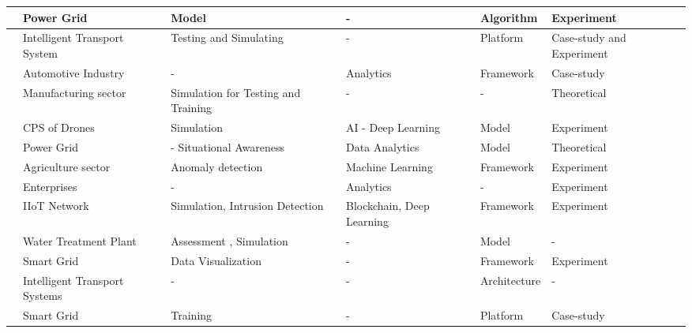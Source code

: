 \begin{table}[H]
\begin{NiceTabular}{p{0.5cm}|p{3cm}|p{2.5cm}|p{2cm}|p{3cm}|p{1.5cm}}
   \cite{hossenDigitalTwinSelfSecurity2021} & Power Grid & Model & - & Algorithm & Experiment \\
   \hline

   \cite{luongnguyenDigitalTwinIoT2022} & Intelligent Transport System & Testing and Simulating & - & Platform & Case-study and Experiment \\
    \hline

    \cite{almeaibedDigitalTwinAnalysis2021} & Automotive Industry & - & Analytics & Framework & Case-study \\
    \hline

    \cite{becueCyberFactorySecuringIndustry40with2018} & Manufacturing sector & Simulation for Testing and Training & - & - & Theoretical \\ 
    \hline

    \cite{wuDeepLearningDriven2022} & CPS of Drones & Simulation & AI - Deep Learning & Model & Experiment \\
    \hline

    \cite{salviCyberresilienceCriticalCyber2022} & Power Grid & - Situational Awareness & Data Analytics & Model & Theoretical \\
    \hline

    \cite{chukkapalliCyberPhysicalSystemSecurity2021} & Agriculture sector & Anomaly detection & Machine Learning & Framework & Experiment \\
    \hline

    \cite{hadarCyberDigitalTwin2020} & Enterprises & - & Analytics & - & Experiment \\
    \hline

    \cite{kumarBlockchainDeepLearning2022} & IIoT Network & Simulation, Intrusion Detection & Blockchain, Deep Learning & Framework & Experiment \\
    \hline

    \cite{sugumarAssessmentMethodDetecting2019} & Water Treatment Plant & Assessment , Simulation & - & Model & - \\
    \hline

    \cite{williamdanilczykANGELIntelligentDigital2019} & Smart Grid & Data Visualization & - & Framework & Experiment \\
    \hline

    \cite{masiSecuringCriticalInfrastructures2023} & Intelligent Transport Systems & - & - & Architecture & - \\
    \hline

    \cite{kandasamyElectricPowerDigital2022} & Smart Grid & Training & - & Platform & Case-study \\
    \hline


\end{NiceTabular}
\end{table}
